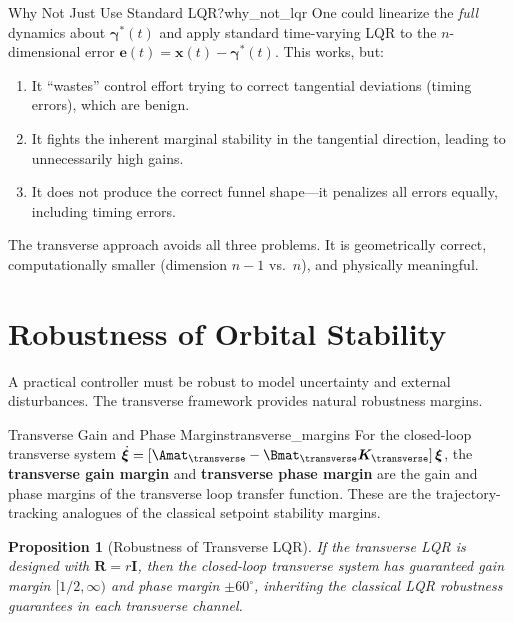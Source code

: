 \documentclass[12pt, openany]{book}
\theoremstyle{plain}
\newtheorem{proposition}{Proposition}[chapter]
\newcommand{\state}{\bm{x}}
\newcommand{\traj}{\bm{\gamma}}
\begin{document}
\begin{remark}{Why Not Just Use Standard LQR?}{why_not_lqr}
  One could linearize the \emph{full} dynamics about $\traj^*(t)$ and apply
  standard time-varying LQR to the $n$-dimensional error
  $\bm{e}(t) = \state(t) - \traj^*(t)$. This works, but:
  \begin{enumerate}[label=(\alph*)]
    \item It ``wastes'' control effort trying to correct tangential deviations
      (timing errors), which are benign.
    \item It fights the inherent marginal stability in the tangential direction,
      leading to unnecessarily high gains.
    \item It does not produce the correct funnel shape---it penalizes all
      errors equally, including timing errors.
  \end{enumerate}
  The transverse approach avoids all three problems. It is geometrically
  correct, computationally smaller (dimension $n - 1$ vs.\ $n$), and
  physically meaningful.
\end{remark}

\section{Robustness of Orbital Stability}

A practical controller must be robust to model uncertainty and external
disturbances. The transverse framework provides natural robustness margins.

\begin{definition}{Transverse Gain and Phase Margins}{transverse_margins}
  For the closed-loop transverse system
  $\dot{\bm{\xi}} = [\Amat_\transverse - \Bmat_\transverse \bm{K}_\transverse]\, \bm{\xi}$,
  the \textbf{transverse gain margin} and \textbf{transverse phase margin}
  are the gain and phase margins of the transverse loop transfer function.
  These are the trajectory-tracking analogues of the classical setpoint
  stability margins.
\end{definition}

\begin{proposition}[Robustness of Transverse LQR]\label{prop:lqr_robust}
  If the transverse LQR is designed with $\bm{R} = r\bm{I}$, then the
  closed-loop transverse system has guaranteed gain margin
  $[1/2, \infty)$ and phase margin $\pm 60^\circ$, inheriting the
  classical LQR robustness guarantees in each transverse channel.
\end{proposition}
\end{document}
